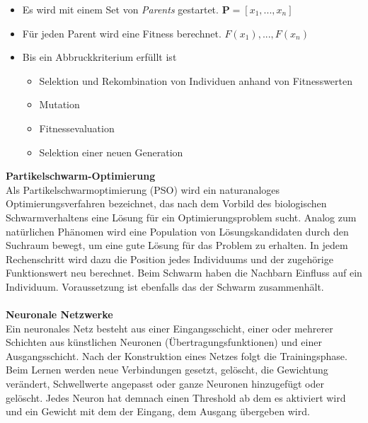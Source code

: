 			\begin{itemize}
				\item Es wird mit einem Set von \textit{Parents} gestartet. $ \bm{P} = [x_{1}, ..., x_{n}] $
				\item Für jeden Parent wird eine Fitness berechnet. $ F(x_{1}), ..., F(x_{n}) $
				\item Bis ein Abbruckkriterium erfüllt ist
				\begin{itemize}
					\item Selektion und Rekombination von Individuen anhand von Fitnesswerten 
					\item Mutation
					\item Fitnessevaluation
					\item Selektion einer neuen Generation
				\end{itemize}
			\end{itemize}
			\leavevmode
			\textbf{Partikelschwarm-Optimierung}\\
			Als Partikelschwarmoptimierung (PSO) wird ein naturanaloges Optimierungsverfahren bezeichnet, das nach dem Vorbild des biologischen Schwarmverhaltens eine Lösung für ein Optimierungsproblem sucht. Analog zum natürlichen Phänomen wird eine Population von Lösungskandidaten durch den Suchraum bewegt, um eine gute Lösung für das Problem zu erhalten. In jedem Rechenschritt wird dazu die Position jedes Individuums und der zugehörige Funktionswert neu berechnet. Beim Schwarm haben die Nachbarn Einfluss auf ein Individuum. Voraussetzung ist ebenfalls das der Schwarm zusammenhält.
			\leavevmode\\\\
			\textbf{Neuronale Netzwerke}\\
			Ein neuronales Netz besteht aus einer Eingangsschicht, einer oder mehrerer Schichten aus künstlichen Neuronen (Übertragungsfunktionen) und einer Ausgangsschicht. Nach der Konstruktion eines Netzes folgt die Trainingsphase. Beim Lernen werden neue Verbindungen gesetzt, gelöscht, die Gewichtung verändert, Schwellwerte angepasst oder ganze Neuronen hinzugefügt oder gelöscht. Jedes Neuron hat demnach einen Threshold ab dem es aktiviert wird und ein Gewicht mit dem der Eingang, dem Ausgang übergeben wird.
			
